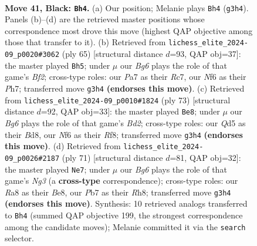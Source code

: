 \documentclass[11pt]{article}
\begin{document}
\begin{figure}[p]
\label{fig:thought-m79}
\end{figure}

\clearpage

\begin{figure}[p]\centering
\begin{subfigure}{0.46\textwidth}\centering
\resizebox{\linewidth}{!}{%
\newchessgame
\chessboard[
  setfen={r1b4k/ppp2pp1/5n2/3q3p/1B3P2/4Q1bP/PPB3P1/R5K1 b - - 0 41},
  showmover=false,
  pgfstyle=straightmove, color=movearrow, markmove={g3-h4}
]}
\caption{}
\end{subfigure}\hfill
\begin{subfigure}{0.46\textwidth}\centering
\resizebox{\linewidth}{!}{%
\newchessgame
\chessboard[
  setfen={7k/2r2b1p/p1nN1p1q/4p3/Q3Pb1P/2P5/PP2BB2/3R3K b - - 8 33},
  showmover=false,
  pgfstyle=straightmove, color=movearrow, markmove={f7-h5}
]}
\caption{}
\end{subfigure}
\\[4pt]
\begin{subfigure}{0.46\textwidth}\centering
\resizebox{\linewidth}{!}{%
\newchessgame
\chessboard[
  setfen={3b1r2/1Q1b1p1k/2pp1P1p/4p2q/2B1P2p/2PP4/6PN/5R1K b - - 1 37},
  showmover=false,
  pgfstyle=straightmove, color=movearrow, markmove={d7-e8}
]}
\caption{}
\end{subfigure}\hfill
\begin{subfigure}{0.46\textwidth}\centering
\resizebox{\linewidth}{!}{%
\newchessgame
\chessboard[
  setfen={1k2b2r/1p6/1q4n1/4PBPp/p6P/PpQ5/6P1/3R1N1K b - - 0 36},
  showmover=false,
  pgfstyle=straightmove, color=movearrow, markmove={g6-e7}
]}
\caption{}
\end{subfigure}
\caption{\textbf{Move 41, Black: \texttt{Bh4}.} (a) Our position; Melanie plays \texttt{Bh4} (\texttt{g3h4}). Panels (b)--(d) are the retrieved master positions whose correspondence most drove this move (highest QAP objective among those that transfer to it). (b) Retrieved from \texttt{lichess\_elite\_2024-09\_p0020\#3062} (ply 65) [structural distance $d$=93, QAP obj=37]: the master played \texttt{Bh5}; under $\mu$ our \emph{Bg6} plays the role of that game's \emph{Bf2}; cross-type roles: our \emph{P}a7 as their \emph{R}c7, our \emph{N}f6 as their \emph{P}h7; transferred move \texttt{g3h4} \textbf{(endorses this move)}. (c) Retrieved from \texttt{lichess\_elite\_2024-09\_p0010\#1824} (ply 73) [structural distance $d$=92, QAP obj=33]: the master played \texttt{Be8}; under $\mu$ our \emph{Bg6} plays the role of that game's \emph{Bd2}; cross-type roles: our \emph{Q}d5 as their \emph{B}d8, our \emph{N}f6 as their \emph{R}f8; transferred move \texttt{g3h4} \textbf{(endorses this move)}. (d) Retrieved from \texttt{lichess\_elite\_2024-09\_p0026\#2187} (ply 71) [structural distance $d$=81, QAP obj=32]: the master played \texttt{Ne7}; under $\mu$ our \emph{Bg6} plays the role of that game's \emph{Ng3} (a \textbf{cross-type} correspondence); cross-type roles: our \emph{R}a8 as their \emph{B}e8, our \emph{P}b7 as their \emph{R}h8; transferred move \texttt{g3h4} \textbf{(endorses this move)}. Synthesis: 10 retrieved analogs transferred to \texttt{Bh4} (summed QAP objective 199, the strongest correspondence among the candidate moves); Melanie committed it via the \texttt{search} selector.}

\end{figure}
\end{document}
